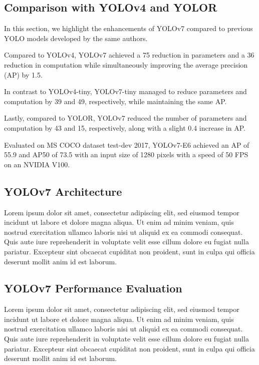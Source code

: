 \documentclass{article}
\begin{document}
\subsection{Comparison with YOLOv4 and YOLOR}

In this section, we highlight the enhancements of YOLOv7 compared to previous YOLO models developed by the same authors.

Compared to YOLOv4, YOLOv7 achieved a 75 reduction in parameters and a 36 reduction in computation while simultaneously improving the average precision (AP) by 1.5.

In contrast to YOLOv4-tiny, YOLOv7-tiny managed to reduce parameters and computation by 39 and 49, respectively, while maintaining the same AP.

Lastly, compared to YOLOR, YOLOv7 reduced the number of parameters and computation by 43 and 15, respectively, along with a slight 0.4 increase in AP.

Evaluated on MS COCO dataset test-dev 2017, YOLOv7-E6 achieved an AP of 55.9 and AP50 of 73.5 with an input size of 1280 pixels with a speed of 50 FPS on an NVIDIA V100.

\subsection{YOLOv7 Architecture}


Lorem ipsum dolor sit amet, consectetur adipiscing elit, sed eiusmod tempor incidunt ut labore et dolore magna aliqua. Ut enim ad minim veniam, quis nostrud exercitation ullamco laboris nisi ut aliquid ex ea commodi consequat. Quis aute iure reprehenderit in voluptate velit esse cillum dolore eu fugiat nulla pariatur. Excepteur sint obcaecat cupiditat non proident, sunt in culpa qui officia deserunt mollit anim id est laborum.

\subsection{YOLOv7 Performance Evaluation}


Lorem ipsum dolor sit amet, consectetur adipiscing elit, sed eiusmod tempor incidunt ut labore et dolore magna aliqua. Ut enim ad minim veniam, quis nostrud exercitation ullamco laboris nisi ut aliquid ex ea commodi consequat. Quis aute iure reprehenderit in voluptate velit esse cillum dolore eu fugiat nulla pariatur. Excepteur sint obcaecat cupiditat non proident, sunt in culpa qui officia deserunt mollit anim id est laborum.
\end{document}

